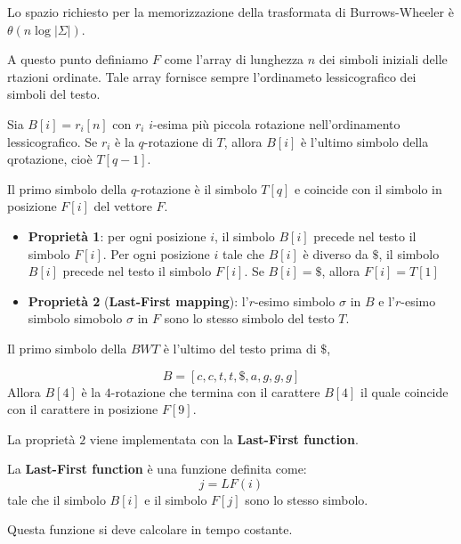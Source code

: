 Lo spazio richiesto per la memorizzazione della trasformata di Burrows-Wheeler è
$\theta(n \log |\Sigma|)$.

A questo punto definiamo $F$ come l'array di lunghezza $n$ dei simboli iniziali
delle rtazioni ordinate. Tale array fornisce sempre l'ordinameto lessicografico
dei simboli del testo.

Sia $B[i] = r_i[n]$ con $r_i$ $i$-esima più piccola rotazione nell'ordinamento
lessicografico. Se $r_i$ è la $q$-rotazione di $T$, allora $B[i]$ è l'ultimo
simbolo della qrotazione, cioè $T[q-1]$.

Il primo simbolo della $q$-rotazione è il simbolo $T[q]$ e coincide con il simbolo
in posizione $F[i]$ del vettore $F$.
\begin{itemize}
    \item \textbf{Proprietà 1}: per ogni posizione $i$, il simbolo $B[i]$ precede
          nel testo il simbolo $F[i]$. Per ogni posizione $i$ tale che $B[i]$ è
          diverso da $\$$, il simbolo $B[i]$ precede nel testo il simbolo $F[i]$.
          Se $B[i] = \$$, allora $F[i] = T[1]$
    \item \textbf{Proprietà 2} (\textbf{Last-First mapping}): l'$r$-esimo simbolo
          $\sigma$ in $B$ e l'$r$-esimo simbolo simobolo $\sigma$ in $F$ sono lo
          stesso simbolo del testo $T$.
\end{itemize}
\begin{nota}
    Il primo simbolo della $BWT$ è l'ultimo del testo prima di $\$$,
\end{nota}
\begin{esempio} %
    \begin{equation}
        B = [c, c, t, t, \$, a, g, g, g]
    \end{equation}
    Allora $B[4]$ è la $4$-rotazione che termina con il carattere $B[4]$ il quale
    coincide con il carattere in posizione $F[9]$.
\end{esempio}
La proprietà $2$ viene implementata con la \textbf{Last-First function}.
\begin{definizione}
    La \textbf{Last-First function} è una funzione definita come:
    \begin{equation}
        j = LF(i)
    \end{equation}
    tale che il simbolo $B[i]$ e il simbolo $F[j]$ sono lo stesso simbolo.
\end{definizione}
Questa funzione si deve calcolare in tempo costante.

